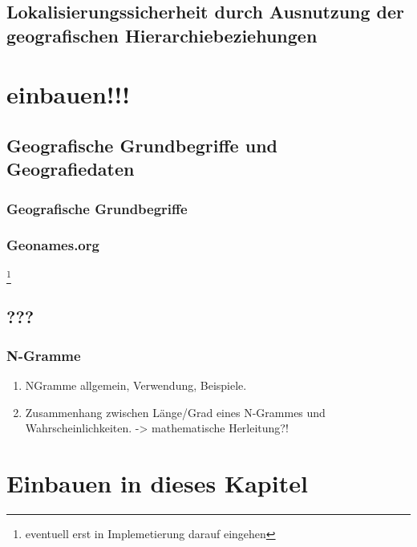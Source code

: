 	\subsection{Lokalisierungssicherheit durch Ausnutzung der geografischen Hierarchiebeziehungen}


\section*{einbauen!!!}
\subsection{Geografische Grundbegriffe und Geografiedaten}

		\subsubsection{Geografische Grundbegriffe}

		\subsubsection{Geonames.org} \footnote{eventuell erst in Implemetierung darauf eingehen} 
			

		\subsubsection{}	

	\subsection{???} 
		\subsubsection{N-Gramme}
			\begin{enumerate}
				\item NGramme allgemein, Verwendung, Beispiele. 
				\item {} Zusammenhang zwischen Länge/Grad eines N-Grammes und Wahrscheinlichkeiten. -> mathematische Herleitung?!
			\end{enumerate}




\section{Einbauen in dieses Kapitel}

